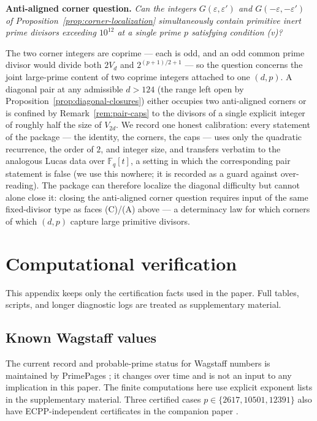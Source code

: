 \documentclass[11pt]{amsart}
\theoremstyle{plain}
\theoremstyle{definition}
\theoremstyle{remark}
\numberwithin{equation}{section}
\newcommand{\F}{\mathbb{F}}
\begin{document}
\medskip
\noindent\textbf{Anti-aligned corner question.} \emph{Can the integers $G(\varepsilon, \varepsilon')$ and $G(-\varepsilon, -\varepsilon')$ of Proposition~\ref{prop:corner-localization} simultaneously contain primitive inert prime divisors exceeding $10^{12}$ at a single prime $p$ satisfying condition (v)?}
\medskip

The two corner integers are coprime --- each is odd, and an odd common prime divisor would divide both $2 V_d$ and $2^{(p+1)/2 + 1}$ --- so the question concerns the joint large-prime content of two coprime integers attached to one $(d, p)$. A diagonal pair at any admissible $d > 124$ (the range left open by Proposition~\ref{prop:diagonal-closures}) either occupies two anti-aligned corners or is confined by Remark~\ref{rem:pair-caps} to the divisors of a single explicit integer of roughly half the size of $V_{2d}$. We record one honest calibration: every statement of the package --- the identity, the corners, the caps --- uses only the quadratic recurrence, the order of $2$, and integer size, and transfers verbatim to the analogous Lucas data over $\F_q[t]$, a setting in which the corresponding pair statement is false (we use this nowhere; it is recorded as a guard against over-reading). The package can therefore localize the diagonal difficulty but cannot alone close it: closing the anti-aligned corner question requires input of the same fixed-divisor type as faces (C)/(A) above --- a determinacy law for which corners of which $(d, p)$ capture large primitive divisors.

\section{Computational verification}\label{sec:computational}

This appendix keeps only the certification facts used in the paper. Full tables, scripts, and longer diagnostic logs are treated as supplementary material.

\subsection{Known Wagstaff values}

The current record and probable-prime status for Wagstaff numbers is maintained by PrimePages \cite{ref:PrimePagesWagstaff}; it changes over time and is not an input to any implication in this paper. The finite computations here use explicit exponent lists in the supplementary material. Three certified cases $p\in\{2617,10501,12391\}$ also have ECPP-independent certificates in the companion paper \cite{ref:A}.
\end{document}

